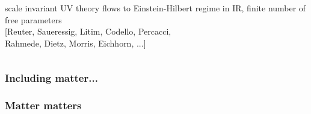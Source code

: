 \documentclass[]{beamer}  %
\begin{document}
\begin{frame}
\begin{columns}[T]
\begin{column}{.6\textwidth}
\begin{center}
        \vspace{15pt}
        scale invariant UV theory flows to Einstein-Hilbert regime in IR,
        finite number of free parameters\\[5pt]
        \hfill [Reuter, Saueressig, Litim, Codello, Percacci,\\
        \hfill Rahmede, Dietz, Morris, Eichhorn, ...]
      \end{center}
    \end{column}
  \end{columns}

\end{frame}



\begin{frame}
  \frametitle{Including matter...}

\end{frame}



\begin{frame}
  \frametitle{Matter matters}

\end{frame}


\end{document}

